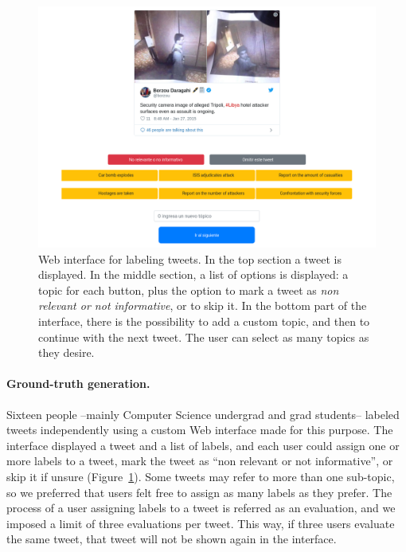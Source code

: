 \begin{figure}[t]
    \centering
    \includegraphics[width=.8\textwidth]{figures/url-model/label.png}
    \caption[Web interface for labeling tweets.]
    {Web interface for labeling tweets. In the top section a tweet is displayed.
    In the middle section, a list of options is displayed: a topic for each
    button, plus the option to mark a tweet as {\it non relevant or not
    informative}, or to skip it. In the bottom part of the interface, there is
    the possibility to add a custom topic, and then to continue with the next
    tweet. The user can select as many topics as they desire.}\label{fig:gt-web} \end{figure}%

\paragraph{Ground-truth generation.}
%
Sixteen people --mainly Computer Science undergrad and grad students-- labeled
tweets independently using a custom Web interface made for this purpose.
%
The interface displayed a tweet and a list of labels, and each user could assign
one or more labels to a tweet, mark the tweet as ``non relevant or not
informative'', or skip it if unsure (Figure~\ref{fig:gt-web}).
%
Some tweets may refer to more than one sub-topic, so we preferred that users
felt free to assign as many labels as they prefer.
%
The process of a user assigning labels to a tweet is referred as an evaluation,
and we imposed a limit of three evaluations per tweet.
%
This way, if three users evaluate the same tweet, that tweet will not be shown
again in the interface.


